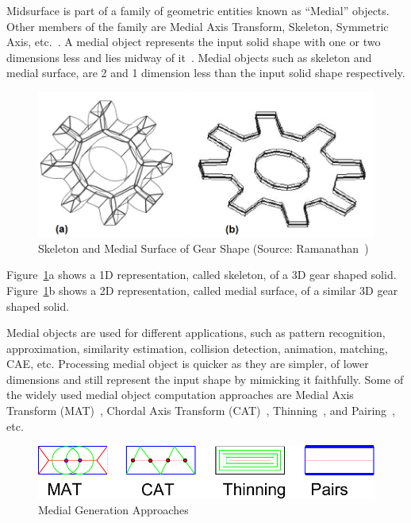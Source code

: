 Midsurface is part of a family of geometric entities known as ``Medial'' objects. Other members of the family are Medial Axis Transform, Skeleton, Symmetric Axis, etc.~\cite{Butlin2009}. A medial object represents the input solid shape with one or two dimensions less and lies midway of it~\cite{Armstrong}.  Medial objects such as skeleton and medial surface, are 2 and 1 dimension less than the input solid shape respectively.


	\begin{figure} [h]
		\centering
		\includegraphics[width=0.7\linewidth]{..//Common/images/mat2d3d}
		\caption{Skeleton and Medial Surface of Gear Shape (Source: Ramanathan~\cite{Ramanathan2004, Ramanathan2005})}
		\label{fig:litsurvey:mat2d3d}
	\end{figure}
	

Figure~\ref{fig:litsurvey:mat2d3d}a shows a 1D representation, called skeleton, of a 3D gear shaped solid. Figure~\ref{fig:litsurvey:mat2d3d}b shows a 2D representation, called medial surface, of a similar 3D gear shaped solid. 

Medial objects are used for different applications, such as pattern recognition, approximation, similarity estimation, collision detection, animation, matching, CAE, etc. Processing medial object is quicker as they are simpler, of lower dimensions and still represent the input shape by mimicking it faithfully. Some of the widely used medial object computation approaches are Medial Axis Transform (MAT)~\cite{Harry1967},  Chordal Axis Transform (CAT)~\cite{Prasad2007}, Thinning~\cite{Lam1992}, and Pairing~\cite{Rezayat1996}, etc.  



	\begin{figure} [h]
		\centering
		\includegraphics[width=0.7\linewidth]{..//Common/images/MedialMethodsOnlyShort.pdf}
		\caption{Medial Generation Approaches}
		\label{fig:litsurvey:medials}
	\end{figure}
	
